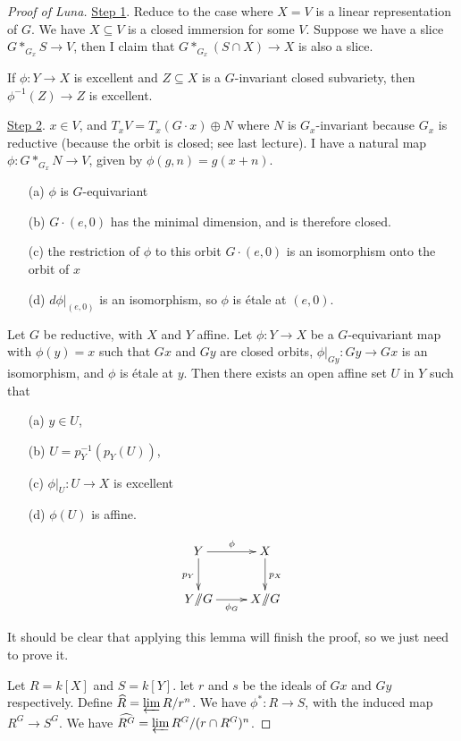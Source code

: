 \begin{proof}[Proof of Luna]
 \underline{Step 1}. Reduce to the case where $X=V$ is a linear representation of $G$. We have $X\subseteq V$ is a closed immersion for some $V$. Suppose we have a slice $G*_{G_x}S\to V$, then I claim that $G*_{G_x} (S\cap X)\to X$ is also a slice.
 \begin{exercise}
  If $\phi\colon Y\to X$ is excellent and $Z\subseteq X$ is a $G$-invariant closed subvariety, then $\phi^{-1}(Z)\to Z$ is excellent.
 \end{exercise}

 \underline{Step 2}. $x\in V$, and $T_xV=T_x (G\cdot x)\oplus N$ where $N$ is $G_x$-invariant because $G_x$ is reductive (because the orbit is closed; see last lecture). I have a natural map $\phi\colon G*_{G_x}N\to V$, given by $\phi(g,n)=g(x+n)$.
 \begin{enumerate}
  \item[(a)] $\phi$ is $G$-equivariant
  \item[(b)] $G\cdot (e,0)$ has the minimal dimension, and is therefore closed.
  \item[(c)] the restriction of $\phi$ to this orbit $G\cdot (e,0)$ is an isomorphism onto the orbit of $x$
  \item[(d)] $d\phi|_{(e,0)}$ is an isomorphism, so $\phi$ is \'etale at $(e,0)$. 
 \end{enumerate}
 \begin{lemma}
  Let $G$ be reductive, with $X$ and $Y$ affine. Let $\phi\colon Y\to X$ be a $G$-equivariant map with $\phi(y)=x$ such that $Gx$ and $Gy$ are closed orbits, $\phi|_{Gy}\colon Gy\to Gx$ is an isomorphism, and $\phi$ is \'etale at $y$. Then there exists an open affine set $U$ in $Y$ such that
  \begin{enumerate}
   \item[(a)] $y\in U$,
   \item[(b)] $U=p_Y^{-1}(p_Y(U))$,
   \item[(c)] $\phi|_U:U\to X$ is excellent
   \item[(d)] $\phi(U)$ is affine.
  \end{enumerate}
 \[\xymatrix{
  Y\ar[r]^\phi \ar[d]_{p_Y} & X\ar[d]^{p_X}\\
  Y\quot G\ar[r]_{\phi_G} & X\quot G
 }\]
 \end{lemma}
 It should be clear that applying this lemma will finish the proof, so we just need to prove it.
 
 Let $R=k[X]$ and $S=k[Y]$. let $r$ and $s$ be the ideals of $Gx$ and $Gy$ respectively. Define $\widehat{R}=\varprojlim R/r^n$. We have $\phi^*\colon R\to S$, with the induced map $R^G\to S^G$. We have $\widehat{R^G}=\varprojlim R^G/(r\cap R^G)^n$.
 

\end{proof}
